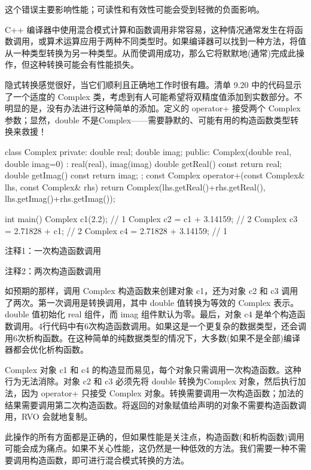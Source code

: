 这个错误主要影响性能；可读性和有效性可能会受到轻微的负面影响。

C++ 编译器中使用混合模式计算和函数调用非常容易，这种情况通常发生在将函数调用，或算术运算应用于两种不同类型时。如果编译器可以找到一种方法，将值从一种类型转换为另一种类型。从而使调用成功，那么它将默默地(通常)完成此操作，但这种转换可能会有性能损失。


隐式转换感觉很好，当它们顺利且正确地工作时很有趣。清单 9.20 中的代码显示了一个适度的 Complex 类，考虑到有人可能希望将双精度值添加到实数部分。不明显的是，没有办法进行这种简单的添加。定义的 operator+ 接受两个 Complex 参数；显然，double 不是Complex——需要静默的、可能有用的构造函数类型转换来救援！


\begin{cpp}
class Complex {
private:
  double real;
  double imag;
public:
  Complex(double real, double imag=0) : real(real), imag(imag) {}
  double getReal() const { return real; }
  double getImag() const { return imag; }
};
const Complex operator+(const Complex& lhs, const Complex& rhs) {
  return Complex(lhs.getReal()+rhs.getReal(), lhs.getImag()+rhs.getImag());
}

int main() {
  Complex c1(2.2); // 1
  Complex c2 = c1 + 3.14159; // 2
  Complex c3 = 2.71828 + c1; // 2
  Complex c4 = 2.71828 + 3.14159; // 1
}
\end{cpp}

{\footnotesize
注释1：一次构造函数调用

注释2：两次构造函数调用
}

如预期的那样，调用 Complex 构造函数来创建对象 c1，还为对象 c2 和 c3 调用了两次。第一次调用是转换调用，其中 double 值转换为等效的 Complex 表示。double 值初始化 real 组件，而 imag 组件默认为零。最后，对象 c4 是单个构造函数调用。4行代码中有6次构造函数调用。如果这是一个更复杂的数据类型，还会调用6次析构函数。在这种简单的纯数据类型的情况下，大多数(如果不是全部)编译器都会优化析构函数。


Complex 对象 c1 和 c4 的构造显而易见，每个对象只需调用一次构造函数。这种行为无法消除。对象 c2 和 c3 必须先将 double 转换为Complex 对象，然后执行加法，因为 operator+ 只接受 Complex 对象。转换需要调用一次构造函数；加法的结果需要调用第二次构造函数。将返回的对象赋值给声明的对象不需要构造函数调用，RVO 会就地复制。

此操作的所有方面都是正确的，但如果性能是关注点，构造函数(和析构函数)调用可能会成为痛点。如果不关心性能，这仍然是一种低效的方法。我们需要一种不需要调用构造函数，即可进行混合模式转换的方法。

